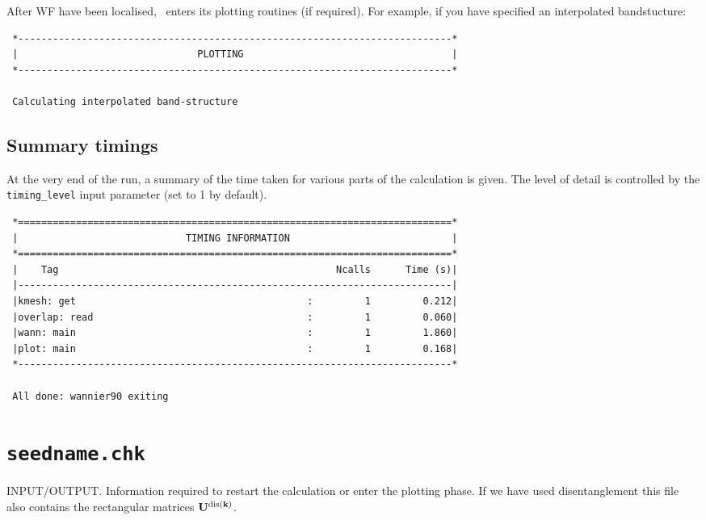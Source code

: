 After WF have been localised, \wannier\ enters its plotting routines
(if required). For example, if you have specified an interpolated
bandstucture: 

\begin{verbatim}
 *---------------------------------------------------------------------------*
 |                               PLOTTING                                    |
 *---------------------------------------------------------------------------*
  
 Calculating interpolated band-structure
\end{verbatim}

\subsection{Summary timings}

At the very end of the run, a summary of the time taken for various
parts of the calculation is given. The level of detail is controlled
by the {\tt timing\_level} input parameter (set to 1 by default).

\begin{verbatim}
 *===========================================================================*
 |                             TIMING INFORMATION                            |
 *===========================================================================*
 |    Tag                                                Ncalls      Time (s)|
 |---------------------------------------------------------------------------|
 |kmesh: get                                        :         1         0.212|
 |overlap: read                                     :         1         0.060|
 |wann: main                                        :         1         1.860|
 |plot: main                                        :         1         0.168|
 *---------------------------------------------------------------------------*
 
 All done: wannier90 exiting
\end{verbatim}



\section{{\tt seedname.chk}}
INPUT/OUTPUT. Information required to restart the calculation or enter the
plotting phase. If we have used disentanglement this file also contains the
rectangular matrices $\bf{U}^{{\rm dis}({\bf k})}$.

